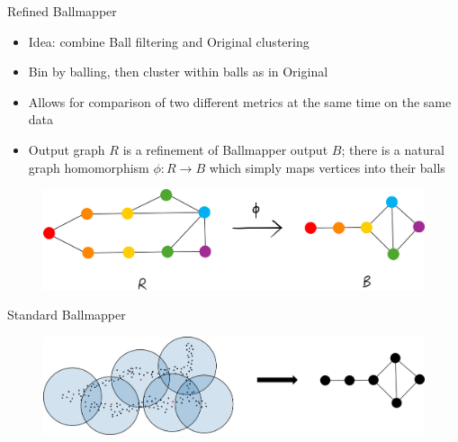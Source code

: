 \documentclass{beamer}
\begin{document}
\begin{frame}{Refined Ballmapper}
  \begin{itemize}
    \item Idea: combine Ball filtering and Original clustering
    \item Bin by balling, then cluster within balls as in Original
    \item Allows for comparison of two different metrics at the same time on the same data
    \item Output graph $R$ is a refinement of Ballmapper output $B$; there 
    is a natural graph homomorphism $\phi: R\to B$ which simply maps vertices into their balls
  \end{itemize}
  \begin{figure}
    \begin{center}
      \includegraphics[width=1\textwidth]{graphhomo2.png}
    \end{center}
  \end{figure}
  
\end{frame}

\begin{frame}{Standard Ballmapper}
  \begin{figure}
    \begin{center}
      \includegraphics[width=1\textwidth]{prerefined.png}
    \end{center}
  \end{figure}
\end{frame}
\end{document}
